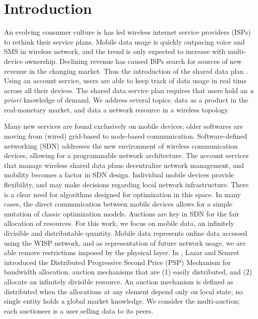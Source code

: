 \section{Introduction}

An evolving consumer culture is has led wireless internet service providers
(ISPs) to rethink their service plans. Mobile data usage is quickly outpacing voice and SMS in
wireless network, and the trend is only expected to increase with
multi-device ownership. Declining revenue has caused ISPs search for sources
of new revenue in the changing market. Thus the introduction of the shared data plan \cite{att}. Using an account
service, users are able to keep track of data usage in real time across all
their devices. 
The shared data service plan requires that users hold an \emph{a priori}
knowledge of demand.
We address several topics: data as a product in the real-monetary market, and
data a network resource in a wireless topology.

Many new services are found exclusively on mobile devices; older softwares
are moving from (wired) grid-based to node-based communication. Software-defined
networking (SDN) addresses the new environment of wireless communication
devices, allowing for a programmable network architecture. 
The account services that manage wireless shared data plans decentralize
network management, and mobility becomes a factor in SDN design.
Individual mobile devices provide flexibility, and may make decisions regarding
local network infrastructure. There is a clear need for algorithms designed for
optimization in this space. In many cases, the direct communication between
mobile devices allows for a simple mutation of classic optimization models.
Auctions are key in SDN for the fair allocation of resources. For this work, we
focus on mobile data, an infinitely divisible and distributable quantity.
Mobile data represents online data accessed using the WISP network, and as
representation of future network usage, we are able remove restrictions imposed
by the physical layer. 
In \cite{lazar}, Lazar and Semret introduced the Distributed Progressive Second Price (PSP)
Mechanism for bandwidth allocation.
auction mechanisms that are (1) easily distributed, and (2) allocate an infinitely
divisible resource.
An auction mechanism is defined
as distributed when the allocations at any element depend only on
local state, no single entity holds a global market knowledge. We consider the
multi-auction; each auctioneer is a user selling data to its peers.

